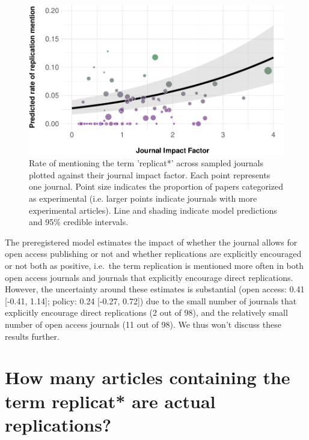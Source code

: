 \documentclass[]{elsarticle} %
\begin{document}
\begin{figure}

{\centering \includegraphics[width=1\linewidth]{ReplicationLing_files/figure-latex/plot-mention-jif-1} 

}

\caption{Rate of mentioning the term 'replicat*' across sampled journals plotted against their journal impact factor. Each point represents one journal. Point size indicates the proportion of papers categorized as experimental (i.e. larger points indicate journals with more experimental articles). Line and shading indicate model predictions and 95\% credible intervals.}\label{fig:plot-mention-jif}
\end{figure}

The preregistered model estimates the impact of whether the journal allows for open access publishing or not and whether replications are explicitly encouraged or not both as positive, i.e.~the term replication is mentioned more often in both open access journals and journals that explicitly encourage direct replications. However, the uncertainty around these estimates is substantial (open access: 0.41 {[}-0.41, 1.14{]}; policy: 0.24 {[}-0.27, 0.72{]}) due to the small number of journals that explicitly encourage direct replications (2 out of 98), and the relatively small number of open access journals (11 out of 98). We thus won't discuss these results further.

\hypertarget{how-many-articles-containing-the-term-replicat-are-actual-replications}{%
\section{How many articles containing the term replicat* are actual replications?}\label{how-many-articles-containing-the-term-replicat-are-actual-replications}}
\end{document}
